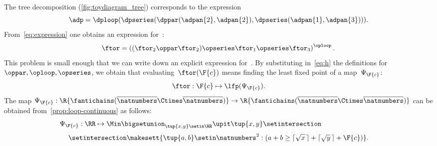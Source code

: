 \begin{marginfigure}
    \caption{}
    \label{fig:toydiagram_tree}
\end{marginfigure}

The tree decomposition (\cref{fig:toydiagram_tree}) corresponds to the expression
%
\begin{equation}
    \adp=\dploop(\dpseries(\dppar(\adpan{2},\adpan{2}),\dpseries(\adpan{1},\adpan{3}))).
    \label{eq:expression}
\end{equation}
%
From~\cref{eq:expression} one obtains an expression for~\ftor:
%
\begin{equation}
    \ftor=\left((\ftor_{2}\oppar\ftor_{2})\opseries\ftor_{1}\opseries\ftor_{3}\right)^{\oploop}.
    \label{eq:h}
\end{equation}
%
This problem is small enough that we can write down an explicit expression for~\ftor.
By substituting in~\cref{eq:h} the definitions for $\oppar, \oploop, \opseries$, we obtain that evaluating~$\ftor(\F{c})$ means finding the least fixed point of a map~$\Psi_{\F{c}}$:
%
\begin{equation}
    \ftor:\F{c}\mapsto\lfp(\Psi_{\F{c}}).
\end{equation}
%
The map $\Psi_{\F{c}}:\R{\fantichains(\overline{\natnumbers}\Ctimes\overline{\natnumbers})}\rightarrow\R{\fantichains(\overline{\natnumbers}\Ctimes\overline{\natnumbers})}$ can be obtained from~\cref{prop:loop-continuous} as follows:
%
\begin{equation}
    \Psi_{\F{c}}:\RR\mapsto\Min\bigsetunion_{\tup{ x,y} \setin\RR}\upit\tup{ x,y} \setintersection\qquad\qquad\qquad\qquad
\end{equation}
%
\begin{equation}
    \setintersection \makesett{
        \tup{ a,b} \setin\natnumbers^{2}:
        (
        a+b\geq\lceil\sqrt{x}\,\rceil+\lceil\sqrt{y}\,\rceil+\F{c}
        )
    }.
\end{equation}
%

